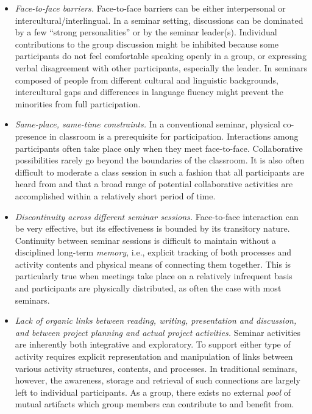\begin{itemize}
\item {\it Face-to-face barriers.} Face-to-face barriers can be either
  interpersonal or intercultural/interlingual. In a seminar setting,
  discussions can be dominated by a few ``strong personalities'' or by the
  seminar leader(s). Individual contributions to the group discussion might
  be inhibited because some participants do not feel comfortable speaking
  openly in a group, or expressing verbal disagreement with other
  participants, especially the leader. In seminars composed of people from
  different cultural and linguistic backgrounds, intercultural gaps and
  differences in language fluency might prevent the minorities from full
  participation.
  
\item {\it Same-place, same-time constraints.} In a conventional seminar,
  physical co-presence in classroom is a prerequisite for participation.
  Interactions among participants often take place only when they meet
  face-to-face. Collaborative possibilities rarely go beyond the boundaries
  of the classroom. It is also often difficult to moderate a class session
  in such a fashion that all participants are heard from and that a broad
  range of potential collaborative activities are accomplished within a
  relatively short period of time.
  
\item {\it Discontinuity across different seminar sessions.} Face-to-face
  interaction can be very effective, but its effectiveness is bounded by
  its transitory nature. Continuity between seminar sessions is difficult
  to maintain without a disciplined long-term {\it memory\/}, i.e.,
  explicit tracking of both processes and activity contents and physical
  means of connecting them together. This is particularly true when
  meetings take place on a relatively infrequent basis and participants are
  physically distributed, as often the case with most seminars.
  
\item {\it Lack of organic links between reading, writing, presentation
  and discussion, and between project planning and actual project
  activities.} Seminar activities are inherently both integrative and
  exploratory. To support either type of activity requires explicit
  representation and manipulation of links between various activity
  structures, contents, and processes. In traditional seminars, however,
  the awareness, storage and retrieval of such connections are largely left
  to individual participants. As a group, there exists no external {\it
  pool\/} of mutual artifacts which group members can contribute to and
  benefit from.
\end{itemize}

